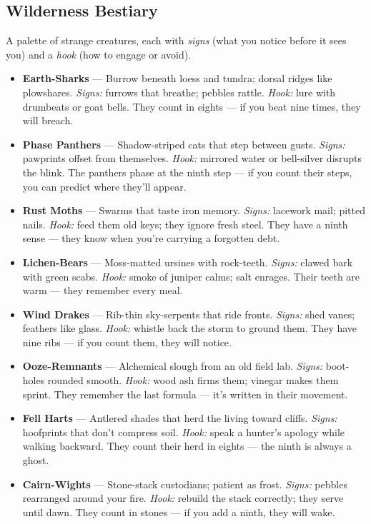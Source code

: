 \subsection*{Wilderness Bestiary}
\label{sec:wilderness-bestiary}
A palette of strange creatures, each with \emph{signs} (what you notice before it sees you) and a \emph{hook} (how to engage or avoid).
\begin{itemize}
  \item \textbf{Earth-Sharks} --- Burrow beneath loess and tundra; dorsal ridges like plowshares. \emph{Signs:} furrows that breathe; pebbles rattle. \emph{Hook:} lure with drumbeats or goat bells. They count in eights --- if you beat nine times, they will breach.
  \item \textbf{Phase Panthers} --- Shadow-striped cats that step between gusts. \emph{Signs:} pawprints offset from themselves. \emph{Hook:} mirrored water or bell-silver disrupts the blink. The panthers phase at the ninth step --- if you count their steps, you can predict where they'll appear.
  \item \textbf{Rust Moths} --- Swarms that taste iron memory. \emph{Signs:} lacework mail; pitted nails. \emph{Hook:} feed them old keys; they ignore fresh steel. They have a ninth sense --- they know when you're carrying a forgotten debt.
  \item \textbf{Lichen-Bears} --- Moss-matted ursines with rock-teeth. \emph{Signs:} clawed bark with green scabs. \emph{Hook:} smoke of juniper calms; salt enrages. Their teeth are warm --- they remember every meal.
  \item \textbf{Wind Drakes} --- Rib-thin sky-serpents that ride fronts. \emph{Signs:} shed vanes; feathers like glass. \emph{Hook:} whistle back the storm to ground them. They have nine ribs --- if you count them, they will notice.
  \item \textbf{Ooze-Remnants} --- Alchemical slough from an old field lab. \emph{Signs:} boot-holes rounded smooth. \emph{Hook:} wood ash firms them; vinegar makes them sprint. They remember the last formula --- it's written in their movement.
  \item \textbf{Fell Harts} --- Antlered shades that herd the living toward cliffs. \emph{Signs:} hoofprints that don't compress soil. \emph{Hook:} speak a hunter's apology while walking backward. They count their herd in eights --- the ninth is always a ghost.
  \item \textbf{Cairn-Wights} --- Stone-stack custodians; patient as frost. \emph{Signs:} pebbles rearranged around your fire. \emph{Hook:} rebuild the stack correctly; they serve until dawn. They count in stones --- if you add a ninth, they will wake.

\end{itemize}
